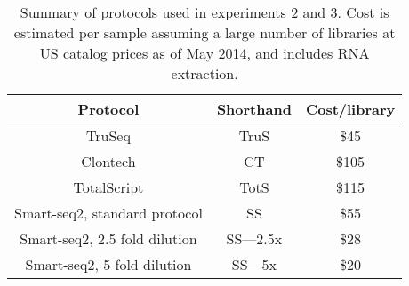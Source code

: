 \begin{table}[htdp]
\caption{Summary of protocols used in experiments 2 and 3. Cost is estimated per sample assuming a
     large number of libraries at US catalog prices as of May 2014, and includes RNA extraction.  }
\begin{tabular}{|c|c|c|}\hline
Protocol & Shorthand & Cost/library \\\hline
TruSeq & TruS & \$45 \\
Clontech & CT & \$105 \\
TotalScript & TotS & \$115 \\
Smart-seq2, standard protocol & SS & \$55 \\
Smart-seq2, 2.5 fold dilution & SS---2.5x & \$28 \\
Smart-seq2, 5 fold dilution & SS---5x & \$20 \\
\hline\end{tabular}
\label{tab:protocolcosts}
\end{table}

